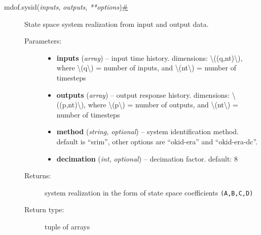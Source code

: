 \begin{description}
\item[{ {{mdof.}}{{sysid}}{(}\emph{{{inputs}}}, \emph{{{outputs}}},
\emph{{{**}}{{options}}}{)}\protect\hyperlink{mdof.sysid}{\#}}]
State space system realization from input and output data.

\begin{description}
\item[Parameters{:}]
\begin{itemize}
\item
  \textbf{inputs} (\emph{array}) -- input time history. dimensions:
  {\textbackslash{}((q,nt)\textbackslash{})}, where
  {\textbackslash{}(q\textbackslash{})} = number of inputs, and
  {\textbackslash{}(nt\textbackslash{})} = number of timesteps
\item
  \textbf{outputs} (\emph{array}) -- output response history.
  dimensions: {\textbackslash{}((p,nt)\textbackslash{})}, where
  {\textbackslash{}(p\textbackslash{})} = number of outputs, and
  {\textbackslash{}(nt\textbackslash{})} = number of timesteps
\item
  \textbf{method} (\emph{string,} \emph{optional}) -- system
  identification method. default is ``srim'', other options are
  ``okid-era'' and ``okid-era-dc''.
\item
  \textbf{decimation} (\emph{int,} \emph{optional}) -- decimation
  factor. default: 8
\end{itemize}
\item[Returns{:}]
system realization in the form of state space coefficients
\texttt{(A,B,C,D)}
\item[Return type{:}]
tuple of arrays
\end{description}
\end{description}

